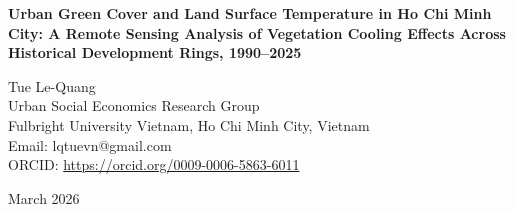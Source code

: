 \documentclass[preprint,12pt]{elsarticle}
\begin{document}
\thispagestyle{empty}
\begin{center}
\vspace*{3cm}

{\LARGE\bfseries Urban Green Cover and Land Surface Temperature in Ho Chi Minh City: A Remote Sensing Analysis of Vegetation Cooling Effects Across Historical Development Rings, 1990--2025}

\vspace{2cm}

{\Large Tue Le-Quang}\\[0.5em]
{\large Urban Social Economics Research Group\\
Fulbright University Vietnam, Ho Chi Minh City, Vietnam}\\[1em]
{\large Email: lqtuevn@gmail.com}\\[0.5em]
{\large ORCID: \url{https://orcid.org/0009-0006-5863-6011}}

\vspace{3cm}


\vspace{2cm}

{\large March 2026}

\end{center}
\clearpage

\end{document}
